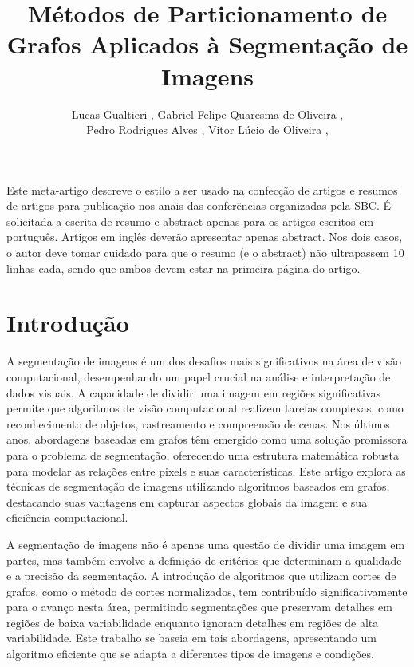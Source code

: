 \documentclass[12pt]{article}
\title {
	Métodos de Particionamento de Grafos Aplicados à Segmentação de Imagens
}
\author {
	Lucas Gualtieri \inst{1},
	Gabriel Felipe Quaresma de Oliveira \inst{1}, \\
	Pedro Rodrigues Alves \inst{1},
	Vitor Lúcio de Oliveira \inst{1},
}
\begin{document}
 

\maketitle

\begin{resumo} 
	Este meta-artigo descreve o estilo a ser usado na confecção de artigos e
	resumos de artigos para publicação nos anais das conferências organizadas
	pela SBC. É solicitada a escrita de resumo e abstract apenas para os artigos
	escritos em português. Artigos em inglês deverão apresentar apenas abstract.
	Nos dois casos, o autor deve tomar cuidado para que o resumo (e o abstract)
	não ultrapassem 10 linhas cada, sendo que ambos devem estar na primeira
	página do artigo.
\end{resumo}

\section{Introdução}
A segmentação de imagens é um dos desafios mais significativos na área de visão computacional, desempenhando um papel crucial na análise e interpretação de dados visuais. A capacidade de dividir uma imagem em regiões significativas permite que algoritmos de visão computacional realizem tarefas complexas, como reconhecimento de objetos, rastreamento e compreensão de cenas. Nos últimos anos, abordagens baseadas em grafos têm emergido como uma solução promissora para o problema de segmentação, oferecendo uma estrutura matemática robusta para modelar as relações entre pixels e suas características. Este artigo explora as técnicas de segmentação de imagens utilizando algoritmos baseados em grafos, destacando suas vantagens em capturar aspectos globais da imagem e sua eficiência computacional.

A segmentação de imagens não é apenas uma questão de dividir uma imagem em partes, mas também envolve a definição de critérios que determinam a qualidade e a precisão da segmentação. A introdução de algoritmos que utilizam cortes de grafos, como o método de cortes normalizados, tem contribuído significativamente para o avanço nesta área, permitindo segmentações que preservam detalhes em regiões de baixa variabilidade enquanto ignoram detalhes em regiões de alta variabilidade. Este trabalho se baseia em tais abordagens, apresentando um algoritmo eficiente que se adapta a diferentes tipos de imagens e condições.
\end{document}
